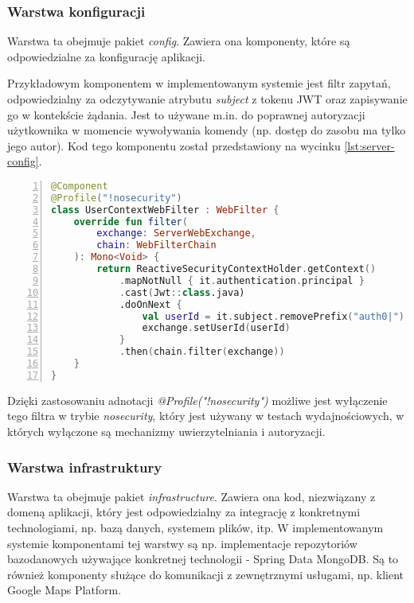 \subsubsection{Warstwa konfiguracji}

Warstwa ta obejmuje pakiet \textit{config}. Zawiera ona komponenty, które są odpowiedzialne za konfigurację aplikacji.

Przykładowym komponentem w implementowanym systemie jest filtr zapytań, odpowiedzialny za odczytywanie atrybutu \textit{subject} z tokenu JWT oraz zapisywanie go w kontekście żądania. Jest to używane m.in. do poprawnej autoryzacji użytkownika w momencie wywoływania komendy (np. dostęp do zasobu ma tylko jego autor). Kod tego komponentu został przedstawiony na wycinku \ref{lst:server-config}.

\begin{lstlisting}[caption={Kod filtra zapytań},label={lst:server-config},captionpos=b,language=Kotlin,numbers=left,showstringspaces=false]
@Component
@Profile("!nosecurity")
class UserContextWebFilter : WebFilter {
    override fun filter(
        exchange: ServerWebExchange,
        chain: WebFilterChain
    ): Mono<Void> {
        return ReactiveSecurityContextHolder.getContext()
            .mapNotNull { it.authentication.principal }
            .cast(Jwt::class.java)
            .doOnNext {
                val userId = it.subject.removePrefix("auth0|")
                exchange.setUserId(userId)
            }
            .then(chain.filter(exchange))
    }
}
\end{lstlisting}

Dzięki zastosowaniu adnotacji \textit{@Profile("!nosecurity")} możliwe jest wyłączenie tego filtra w trybie \textit{nosecurity}, który jest używany w testach wydajnościowych, w których wyłączone są mechanizmy uwierzytelniania i autoryzacji.

\subsubsection{Warstwa infrastruktury}

Warstwa ta obejmuje pakiet \textit{infrastructure}. Zawiera ona kod, niezwiązany z domeną aplikacji, który jest odpowiedzialny za integrację z konkretnymi technologiami, np. bazą danych, systemem plików, itp. W implementowanym systemie komponentami tej warstwy są np. implementacje repozytoriów bazodanowych używające konkretnej technologii - Spring Data MongoDB. Są to również komponenty służące do komunikacji z zewnętrznymi usługami, np. klient Google Maps Platform.

